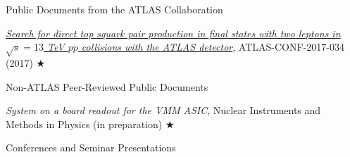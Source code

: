 \begin{minipage}{0.8\textwidth}
\begin{minipage}{1.0\textwidth}
\end{minipage}

\vspace{0.25in}
\hspace{0.2in}Public Documents from the ATLAS Collaboration

\hspace{0.35in}
\begin{minipage}{1.0\textwidth}

\vspace{0.15in}
\href{https://atlas.web.cern.ch/Atlas/GROUPS/PHYSICS/CONFNOTES/ATLAS-CONF-2017-034/}{\textit{Search for direct top
squark pair production in final states with two leptons in $\sqrt{s} = 13$ TeV $pp$ collisions with the ATLAS detector}}, ATLAS-CONF-2017-034 (2017) $\bigstar$

\end{minipage}

\vspace{0.25in}
\hspace{0.2in}Non-ATLAS Peer-Reviewed Public Documents

\hspace{0.35in}
\begin{minipage}{1.0\textwidth}
\vspace{0.15in}
\textit{System on a board readout for the VMM ASIC}, Nuclear Instruments and Methods in Physics (in preparation) $\bigstar$

\end{minipage}


\end{minipage}

\newpage
{\Large Conferences and Seminar Presentations}\\
\HRule

\vspace{0.15in}

